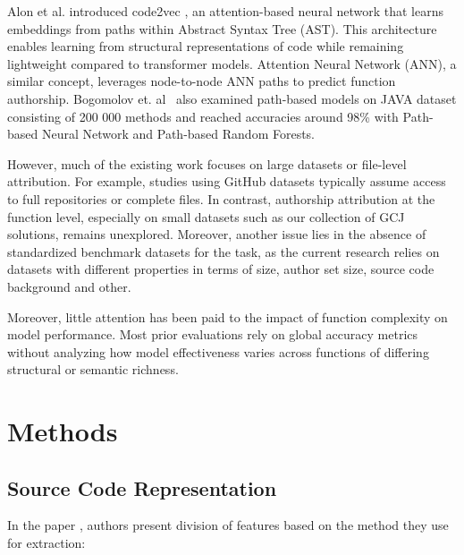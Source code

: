 \documentclass[conference]{IEEEtran}
\begin{document}
Alon et al. introduced code2vec \citet{code2vec}, an attention-based neural 
network that learns embeddings from paths within Abstract Syntax Tree (AST). 
This architecture enables learning from structural representations of code while 
remaining lightweight compared to transformer models. Attention Neural 
Network (ANN), a similar concept, leverages node-to-node ANN paths to 
predict function authorship. 
Bogomolov et. al~\citet{bogomolov} also examined path-based models on JAVA dataset 
consisting of 200 000 methods and reached 
accuracies around 98\% with Path-based Neural Network and Path-based Random Forests.

However, much of the existing work focuses on large datasets or file-level 
attribution. For example, studies using GitHub datasets typically assume 
access to full repositories or complete files. In contrast, authorship 
attribution at the function level, especially on small datasets such as 
our collection of GCJ solutions, remains unexplored. Moreover, another 
issue lies in the absence of standardized benchmark datasets for the task, 
as the current research relies on datasets with different properties in terms 
of size, author set size, source code background and other.

Moreover, little attention has been paid to the impact of function complexity 
on model performance. Most prior evaluations rely on global accuracy metrics 
without analyzing how model effectiveness varies across functions of differing 
structural or semantic richness.

\section{Methods}

\subsection{Source Code Representation}

In the paper \citet{information}, authors present division of features based on the method they use for extraction: 
    
\end{document}
